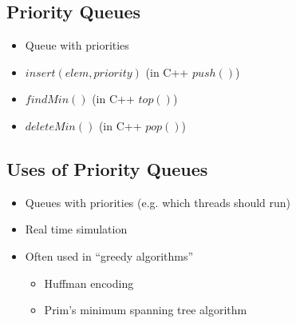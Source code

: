 
\begin{slide}
\section{Priority Queues}

\pausebuild
\begin{itemize}
\item Queue with priorities\pause
\item \jl$insert(elem,priority)$ (in C++ \jl$push()$)\pause
\item \jl$findMin()$ (in C++ \jl$top()$)\pause
\item \jl$deleteMin()$ (in C++ \jl$pop()$)\pause
\end{itemize}
\begin{center}
  \pause
\end{center}
\end{slide}


\begin{slide}
\section{Uses of Priority Queues}

\begin{PauseHighLight}
  \begin{itemize}
  \item Queues with priorities (e.g. which threads should run)\pause
  \item Real time simulation\pause
  \item Often used in ``greedy algorithms''
    \begin{itemize}
    \item Huffman encoding
    \item Prim's minimum spanning tree algorithm\pause
    \end{itemize}
  \end{itemize}
\end{PauseHighLight}
\end{slide}



